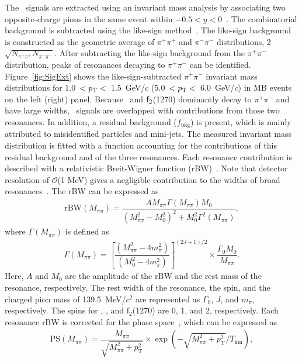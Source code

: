 The \fzero~signals are extracted using an invariant mass analysis by associating two opposite-charge pions in the same event within $-0.5<y<0$~\cite{ALICE:2013wgn}. The combinatorial background is subtracted using the like-sign method~\cite{LIKESIGN}. The like-sign background is constructed as the geometric average of $\pi^{+}\pi^{+}$ and $\pi^{-}\pi^{-}$ distributions, 2$\sqrt{N_{\pi^{+}\pi^{+}}N_{\pi^{-}\pi^{-}}}$. After subtracting the like-sign background from the $\pi^{+}\pi^{-}$ distribution, peaks of resonances decaying to $\pi^{+}\pi^{-}$ can be identified. Figure~\ref{fig:SigExt} shows the like-sign-subtracted $\pi^{+}\pi^{-}$ invariant mass distributions for 1.0~$<p_{\rm{T}}<$~1.5~GeV/$c$ (5.0~$<p_{\rm{T}}<$~6.0~GeV/$c$) in MB events on the left (right) panel. Because \rhoz~and $\rm{f}_{2}$(1270) dominantly decay to $\pi^{+}\pi^{-}$ and have large widths, \fzero~signals are overlapped with contributions from those two resonances. In addition, a residual background ($f_{\mathrm{bkg}}$) is present, which is mainly attributed to misidentified particles and mini-jets. The measured invariant mass distribution is fitted with a function accounting for the contributions of this residual background and of the three resonances. Each resonance contribution is described with a relativistic Breit-Wigner function (rBW)~\cite{ALICE:2018qdv, ALICE:2022qnb}. Note that detector resolution of $\mathcal{O}$(1 MeV) gives a negligible contribution to the widths of broad resonances~\cite{ALICE:2016sak}. The rBW can be expressed as
\begin{eqnarray}
\mathrm{rBW}(M_{\pi\pi}) = \dfrac{AM_{\pi\pi}\Gamma(M_{\pi\pi})M_{0}}{(M_{\pi\pi}^{2}-M_{0}^{2})^{2} + M_{0}^{2}\Gamma^{2}(M_{\pi\pi})},
\label{eq:rBW}
\end{eqnarray}
where $\Gamma(M_{\pi\pi})$ is defined as
\begin{eqnarray}
\Gamma(M_{\pi\pi}) = \left[ \dfrac{ (M_{\pi\pi}^{2} - 4m_{\pi}^{2}) }{ (M_{0}^{2}-4m_{\pi}^{2}) } \right]^{(2J+1)/2} \times \dfrac{\Gamma_{0}M_{0}}{M_{\pi\pi}} .
\label{eq:rBWW}
\end{eqnarray}
Here, $A$ and $M_{0}$ are the amplitude of the rBW and the rest mass of the resonance, respectively. The rest width of the resonance, the spin, and the charged pion mass of 139.5~MeV/$c^{2}$ are represented as $\Gamma_{0}$, $J$, and $m_{\pi}$, respectively. The spins for \fzero, \rhoz, and $\mathrm{f}_{2}$(1270) are 0, 1, and 2, respectively. Each resonance rBW is corrected for the phase space~\cite{ALICE:2018qdv}, which can be expressed as
\begin{eqnarray}
\mathrm{PS}(M_{\pi\pi}) = \dfrac{M_{\pi\pi}}{\sqrt{M_{\pi\pi}^{2}+p_{\mathrm{T}}^{2}}}\times\exp{(-\sqrt{M_{\pi\pi}^{2}+p_{\mathrm{T}}^{2}}/T_{\mathrm{kin}})},
\label{eq:ps}
\end{eqnarray} 
